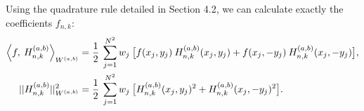 \documentclass[11pt, oneside]{article}   	%
\newcommand{\bstodo}{\todo[color=pink]}
\newcommand{\half}{\frac{1}{2}}
\newcommand{\hdop}{H}
\newcommand{\hdopnk}{\hdop_{n,k}}
\begin{document}
Using the quadrature rule detailed in Section 4.2, we can calculate exactly the coefficients $f_{n,k}$: 
\begin{align*}
	\ip< f, \: \hdopnk^{(a,b)} >_{W^{(a,b)}} &= \half \: \sum_{j=1}^{N^2} w_j \: \big[ f(x_j, y_j) \: \hdopnk^{(a,b)}(x_j, y_j) +f(x_j, -y_j) \: \hdopnk^{(a,b)}(x_j, -y_j) \big], \\
	|| \hdopnk^{(a,b)} ||_{W^{(a,b)}}^2 &= \half \: \sum_{j=1}^{N^2} w_j \: \big[ \hdopnk^{(a,b)}(x_j, y_j)^2 + \hdopnk^{(a,b)}(x_j, -y_j)^2 \big].
\end{align*}

%
%
\end{document}
